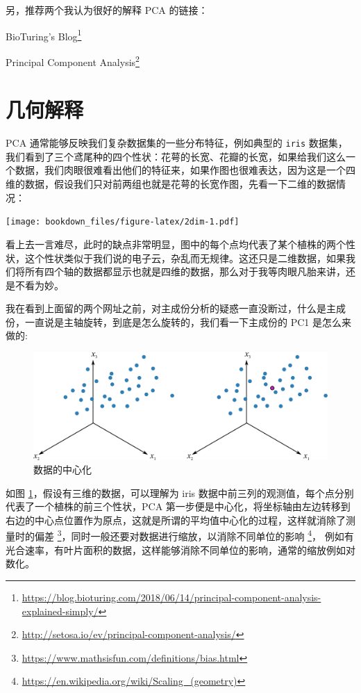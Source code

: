 \documentclass[
]{krantz}
\renewcommand{\href}[2]{#2\footnote{\url{#1}}}
\begin{document}
另，推荐两个我认为很好的解释 PCA 的链接：

\href{https://blog.bioturing.com/2018/06/14/principal-component-analysis-explained-simply/}{BioTuring's Blog}

\href{http://setosa.io/ev/principal-component-analysis/}{Principal Component Analysis}

\hypertarget{geom-pca}{%
\section{几何解释}\label{geom-pca}}

PCA 通常能够反映我们复杂数据集的一些分布特征，例如典型的 \texttt{iris} 数据集，我们看到了三个鸢尾种的四个性状：花萼的长宽、花瓣的长宽，如果给我们这么一个数据，我们肉眼很难看出他们的特征来，如果作图也很难表达，因为这是一个四维的数据，假设我们只对前两组也就是花萼的长宽作图，先看一下二维的数据情况：

\texttt{[image: bookdown\_files/figure-latex/2dim-1.pdf]}

看上去一言难尽，此时的缺点非常明显，图中的每个点均代表了某个植株的两个性状，这个性状类似于我们说的电子云，杂乱而无规律。这还只是二维数据，如果我们将所有四个轴的数据都显示也就是四维的数据，那么对于我等肉眼凡胎来讲，还是不看为妙。

我在看到上面留的两个网址之前，对主成份分析的疑惑一直没断过，什么是主成份，一直说是主轴旋转，到底是怎么旋转的，我们看一下主成份的 PC1 是怎么来做的:

\begin{figure}
\includegraphics[width=1\linewidth]{images/pc1} \caption{数据的中心化}\label{fig:pccenter}
\end{figure}

如图 \ref{fig:pccenter}，假设有三维的数据，可以理解为 iris 数据中前三列的观测值，每个点分别代表了一个植株的前三个性状，PCA 第一步便是中心化，将坐标轴由左边转移到右边的中心点位置作为原点，这就是所谓的平均值中心化的过程，这样就消除了测量时的偏差 \footnote{\url{https://www.mathsisfun.com/definitions/bias.html}}，同时一般还要对数据进行缩放，以消除不同单位的影响 \footnote{\url{https://en.wikipedia.org/wiki/Scaling_(geometry)}}，
例如有光合速率，有叶片面积的数据，这样能够消除不同单位的影响，通常的缩放例如对数化。
\end{document}

